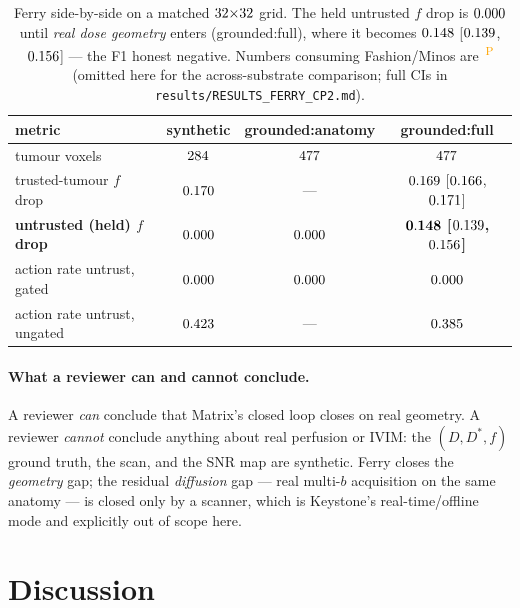 \documentclass[12pt]{iopart}
\newcommand{\PROV}{\textsuperscript{\textcolor{orange}{\,P}}}
\newcommand{\Dstar}{D^{*}}
\newcommand{\fq}{f}          %
\begin{document}
\begin{table}[t]\centering\small
\begin{tabular}{lccc}
\toprule
metric & synthetic & grounded:anatomy & grounded:full \\
\midrule
tumour voxels & $284$ & $477$ & $477$ \\
trusted-tumour $\fq$ drop & $0.170$ & --- & $0.169$ [$0.166$, $0.171$] \\
\textbf{untrusted (held) $\fq$ drop} & $0.000$ & $0.000$ & $\mathbf{0.148}$ \textbf{[$0.139$, $0.156$]} \\
action rate untrust, gated & $0.000$ & $0.000$ & $0.000$ \\
action rate untrust, ungated & $0.423$ & --- & $0.385$ \\
\bottomrule
\end{tabular}
\caption{Ferry side-by-side on a matched $32{\times}32$ grid. The
held untrusted $\fq$ drop is $0.000$ until \emph{real dose geometry} enters
(grounded:full), where it becomes $0.148$ [$0.139$, $0.156$] --- the
F1 honest negative. Numbers consuming Fashion/Minos are \PROV{} (omitted here for the
across-substrate comparison; full CIs in \texttt{results/RESULTS\_FERRY\_CP2.md}).}
\label{tab:ferry}
\end{table}

\paragraph{What a reviewer can and cannot conclude.} A reviewer \emph{can} conclude that
Matrix's closed loop closes on real geometry. A reviewer \emph{cannot} conclude anything
about real perfusion or IVIM: the $(D,\Dstar,\fq)$ ground truth, the scan, and the SNR map
are synthetic. Ferry closes the \emph{geometry} gap; the residual \emph{diffusion} gap ---
real multi-$b$ acquisition on the same anatomy --- is closed only by a scanner, which is
Keystone's real-time/offline mode and explicitly out of scope here.

\section{Discussion}\label{sec:discussion}
\end{document}
